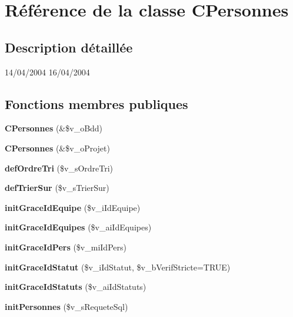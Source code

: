 \section{Référence de la classe CPersonnes}
\label{class_c_personnes}


\subsection{Description détaillée}
14/04/2004  16/04/2004 

\subsection*{Fonctions membres publiques}
\begin{CompactItemize}
\item 
\textbf{CPersonnes} (\&\$v\_\-oBdd)\label{class_c_personnes_be67dd2829993a6b0cf5a8bbe771ad45}

\item 
\textbf{CPersonnes} (\&\$v\_\-oProjet)\label{class_c_personnes_a979308396999fb8f7ab5011b5a1bda7}

\item 
\textbf{defOrdreTri} (\$v\_\-sOrdreTri)\label{class_c_personnes_cc3b2e9a7b5274a015b2417ae9627c67}

\item 
\textbf{defTrierSur} (\$v\_\-sTrierSur)\label{class_c_personnes_25ad5116807b59293c522247395f5ac4}

\item 
\textbf{initGraceIdEquipe} (\$v\_\-iIdEquipe)\label{class_c_personnes_27faf1ad824544260d439cfab7f088ae}

\item 
\textbf{initGraceIdEquipes} (\$v\_\-aiIdEquipes)\label{class_c_personnes_94388422ef3772d19b6c70f5adf03d91}

\item 
\textbf{initGraceIdPers} (\$v\_\-miIdPers)\label{class_c_personnes_ee659418db2409c1795e33c552f1c54b}

\item 
\textbf{initGraceIdStatut} (\$v\_\-iIdStatut, \$v\_\-bVerifStricte=TRUE)\label{class_c_personnes_935a085fd8b696aa274202860a888fe9}

\item 
\textbf{initGraceIdStatuts} (\$v\_\-aiIdStatuts)\label{class_c_personnes_e17581ed9c2f5ed8e40fb40754a0a97a}

\item 
\textbf{initPersonnes} (\$v\_\-sRequeteSql)\label{class_c_personnes_0821b96a2e5d797ce94555cc26eb4ef2}


\end{CompactItemize}
